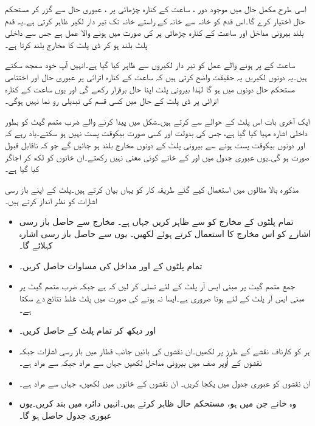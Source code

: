 اسی طرح مکمل حال  میں موجود دور ، ساعت کے کنارہ چڑھائی پر ، عبوری حال  سے گزر کر مستحکم حال  اختیار کرے گا۔اس قدم کو خانہ  سے خانہ  کے راستے خانہ  تک تیر دار لکیر ظاہر کرتی ہے۔یہ قدم بلند بیرونی مداخل  اور ساعت کے کنارہ چڑھائی پر  کی صورت میں ہونے والا عمل ہے جس سے داخلی پلٹ بلند ہو کر ڈی پلٹ کا مخارج بلند  کرتا ہے۔

ساعت کے  پر ہونے والے عمل کو  تیر دار لکیروں سے ظاہر کیا گیا ہے۔انہیں آپ خود سمجھ سکتے ہیں۔یہ دونوں لکیریں یہ حقیقت واضح کرتی ہیں کہ ساعت کے کنارہ اترائی پر عبوری حال اور اختتامی مستحکم حال دونوں میں  ہو گا لہٰذا بیرونی پلٹ اپنا حال برقرار رکھے گی اور یوں ساعت کے کنارہ اترائی پر ڈی پلٹ کے حال میں کسی قسم کی تبدیلی رو نما نہیں ہوگی۔

ایک آخری بات اس پلٹ کے حوالے سے کرتے ہیں۔شکل    میں  پیدا کرنے والے ضرب متمم گیٹ کو  بطور داخلی اشارہ مہیا کیا گیا ہے، جس کی بدولت  اور  کسی صورت بیکوقت پست نہیں ہو سکتے۔یاد رہے کہ  اور  دونوں بیکوقت پست ہونے سے بیرونی پلٹ کے دونوں مخارج بلند ہو جائیں گے جو کہ ناقابل قبول صورت ہو گی۔یوں عبوری جدول میں  اور  کے خانے کوئی معنی نہیں رکھتے۔ان خانوں کو  لکھ کر اجاگر کیا گیا ہے۔

مذکورہ بالا مثالوں میں استعمال کیے گئے طریقہ کار کو یہاں بیان کرتے ہیں۔پلٹ کے اپنے باز رسی اشارات کو نظر انداز کرتے ہیں۔
\begin{itemize}
\item
 تمام پلٹوں کے مخارج کو سے ظاہر کریں جہاں ہے۔ مخارج سے حاصل باز رسی اشارے کو اس مخارج کا  استعمال کرتے ہوئے  لکھیں۔ یوں  سے حاصل باز رسی اشارہ  کہلائے گا۔
\item
 تمام پلٹوں کے  اور  مداخل کی مساوات حاصل کریں۔
\item
 جمع متمم گیٹ پر مبنی ایس آر پلٹ کے لئے تسلی کر لیں کہ  ہے جبکہ ضرب متمم گیٹ پر مبنی ایس آر پلٹ کے لئے  ہونا ضروری ہے۔ایسا نہ ہونے کی صورت میں پلٹ غلط نتائج دے سکتا ہے۔
\item 
{} اور  دیکھ کر تمام پلٹ کے  حاصل کریں۔
\item
 ہر  کو کارناف نقشے کے طرز پر لکھیں۔ان نقشوں کی بائیں جانب قطار میں باز رسی اشارات  جبکہ نقشوں کے اُوپر صف میں بیرونی مداخل  لکھیں جہاں  سے مراد  جبکہ  سے مراد  ہے۔
\item
 ان نقشوں کو عبوری جدول میں یکجا کریں۔ ان نقشوں کے خانوں میں  لکھیں، جہاں  سے مراد  ہے۔
\item
 وہ خانے جن میں  ہو، مستحکم حال ظاہر کرتے ہیں۔انہیں دائرہ میں بند کریں۔یوں عبوری جدول حاصل ہو گا۔
\end{itemize}

